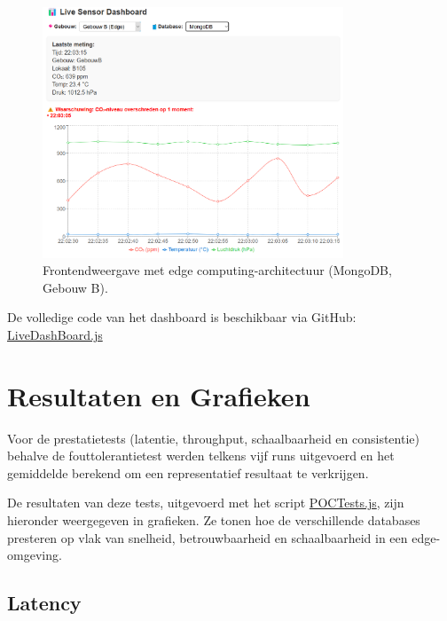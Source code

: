 \begin{figure}[H]
    \centering
    \includegraphics[width=0.8\textwidth]{GebouwB_MongoDb_Website.png}
    \caption{Frontendweergave met edge computing-architectuur (MongoDB, Gebouw B).}
    \label{fig:gebouw-b-architecture}
\end{figure}

De volledige code van het dashboard is beschikbaar via GitHub: \\
\href{https://github.com/WoutVC/bachelorproef2024/blob/main/proof_of_concept/frontend/src/components/LiveDashBoard.js}{LiveDashBoard.js}

\section{Resultaten en Grafieken}
Voor de prestatietests (latentie, throughput, schaalbaarheid en consistentie) behalve de fouttolerantietest werden telkens vijf runs uitgevoerd en het gemiddelde berekend om een representatief resultaat te verkrijgen.

De resultaten van deze tests, uitgevoerd met het script \href{https://github.com/WoutVC/bachelorproef2024/blob/main/proof_of_concept/backend/POCTests.js}{POCTests.js},
 zijn hieronder weergegeven in grafieken. Ze tonen hoe de verschillende databases presteren op vlak van snelheid, betrouwbaarheid en schaalbaarheid in een edge-omgeving.
\subsection{Latency}

